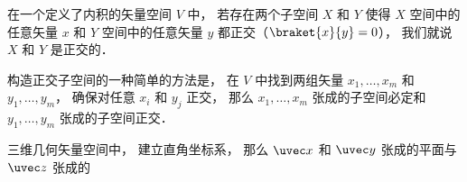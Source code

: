 

在一个定义了内积的矢量空间 $V$ 中， 若存在两个子空间 $X$ 和 $Y$ 使得 $X$ 空间中的任意矢量 $x$ 和 $Y$ 空间中的任意矢量 $y$ 都正交（$\braket{x}{y} = 0$）， 我们就说 $X$ 和 $Y$ 是正交的．

构造正交子空间的一种简单的方法是， 在 $V$ 中找到两组矢量 $x_1, \dots, x_m$ 和 $y_1, \dots, y_m$， 确保对任意 $x_i$ 和 $y_j$ 正交， 那么 $x_1, \dots, x_m$ 张成的子空间必定和 $y_1, \dots, y_m$ 张成的子空间正交．

\begin{example}{}
三维几何矢量空间中， 建立直角坐标系， 那么 $\uvec x$ 和 $\uvec y$ 张成的平面与 $\uvec z$ 张成的
\end{example}
